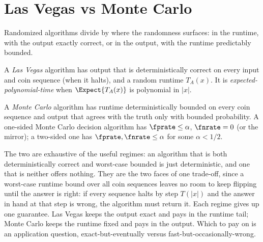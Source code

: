 %

\section{Las Vegas vs Monte Carlo}
\label{sec:las-vegas-vs-monte-carlo}

Randomized algorithms divide by where the randomness surfaces: in the runtime,
with the output exactly correct, or in the output, with the runtime predictably
bounded.

\begin{definition}
\label{def:las-vegas}
A \emph{Las Vegas} algorithm has output that is deterministically correct on
every input and coin sequence (when it halts), and a random runtime $T_A(x)$. It
is \emph{expected-polynomial-time} when $\Expect{T_A(x)}$ is polynomial in $|x|$.
\end{definition}

\begin{definition}
\label{def:monte-carlo}
A \emph{Monte Carlo} algorithm has runtime deterministically bounded on every
coin sequence and output that agrees with the truth only with bounded
probability. A one-sided Monte Carlo decision algorithm has $\fprate \le \alpha$,
$\fnrate = 0$ (or the mirror); a two-sided one has $\fprate, \fnrate \le \alpha$
for some $\alpha < 1/2$.
\end{definition}

The two are exhaustive of the useful regimes: an algorithm that is both
deterministically correct and worst-case bounded is just deterministic, and one
that is neither offers nothing. They are the two faces of one trade-off, since
a worst-case runtime bound over all coin sequences leaves no room to keep
flipping until the answer is right: if every sequence halts by step $T(|x|)$ and
the answer in hand at that step is wrong, the algorithm must return it. Each
regime gives up one guarantee. Las Vegas keeps the output exact and pays in the
runtime tail; Monte Carlo keeps the runtime fixed and pays in the output. Which
to pay on is an application question, exact-but-eventually versus
fast-but-occasionally-wrong.

